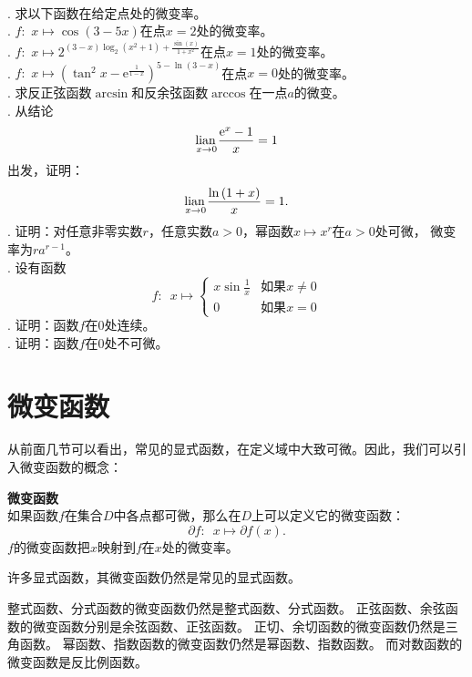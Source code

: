 \documentclass[12pt,UTF8,fontset=none]{ctexbook}
\begin{document}
\begin{xt}
    \mbox{} \\
    . 求以下函数在给定点处的微变率。\\
    . $f: \,\, x \mapsto \cos{(3 - 5x)}$在点$x = 2$处的微变率。\\
    . $f: \,\, x \mapsto 2^{(3 - x)\log_2\left(x^2 + 1\right) + \frac{\sin(x)}{1 + x^2}}$在点$x = 1$处的微变率。\\
    . $f: \,\, x \mapsto (\tan^2{x} - \mathrm{e}^{\frac{1}{1-x}})^{5 - \ln(3 - x)}$在点$x = 0$处的微变率。\\
    . 求反正弦函数$\arcsin$和反余弦函数$\arccos$在一点$a$的微变。\\
    . 从结论
    $$ \underset{x\to 0}{\operatorname{lian}\,} \frac{\mathrm{e}^x - 1}{x} = 1$$
    \indent 出发，证明：
    $$ \underset{x\to 0}{\operatorname{lian}\,} \frac{\ln{(1 + x)}}{x} = 1.$$
    . 证明：对任意非零实数$r$，任意实数$a>0$，幂函数$x \mapsto x^r$在$a>0$处可微，
    微变率为$ra^{r-1}$。\\
    . 设有函数
    $$f: \,\,\, x \mapsto \left\{
        \begin{array}{cl}
            x\sin{\frac{1}{x}}  & \mbox{如果}x \neq 0 \\
            0 & \mbox{如果}x = 0
        \end{array}\right.
    $$
    . 证明：函数$f$在$0$处连续。\\
    . 证明：函数$f$在$0$处不可微。
\end{xt}

\section{微变函数}
从前面几节可以看出，常见的显式函数，在定义域中大致可微。因此，我们可以引入微变函数的概念：
\begin{df}{\textbf{微变函数}}\label{df:2-4-0}
    \mbox{} \\
    如果函数$f$在集合$D$中各点都可微，那么在$D$上可以定义它的微变函数：
    $$ \partial f : \,\,\, x \mapsto \partial f(x). $$
    $f$的微变函数把$x$映射到$f$在$x$处的微变率。
\end{df}

许多显式函数，其微变函数仍然是常见的显式函数。

整式函数、分式函数的微变函数仍然是整式函数、分式函数。
正弦函数、余弦函数的微变函数分别是余弦函数、正弦函数。
正切、余切函数的微变函数仍然是三角函数。
幂函数、指数函数的微变函数仍然是幂函数、指数函数。
而对数函数的微变函数是反比例函数。
\end{document}
